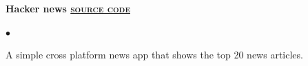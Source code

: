 \documentclass[10pt,a4paper]{extarticle}
\newcommand{\myKnowsBox}[1]{
	\begin{tikzpicture}
		\node [mybox] (box){%
			\color{white}{\textsc{\MakeLowercase{#1}}}};
	\end{tikzpicture}
}
\newcommand{\myProjectItem}[2]{
	\item {
	            \color{resumeBlueDark}
	            \textbf{#1}}\\#2
}
\begin{document}
\begin{minipage}{0.55\textwidth}
\begin{list}{{\color{resumeBlueLight}}}{\leftmargin 1mm}
		\myProjectItem{Hacker news
		\hfill {\href{https://github.com/KunalRaghav/hacker_news}{\color{black}{\fontAwesomeBrands github} \textsc{source code}}}
		}{
			\vspace{-6mm}
			\begin{list}{\color{resumeBlueLight}$\bullet$}{\leftmargin 3mm}
				\item{A simple cross platform news app that shows the top 20 news articles.}

\end{list}}
\end{list}
\end{minipage}
\end{document}
